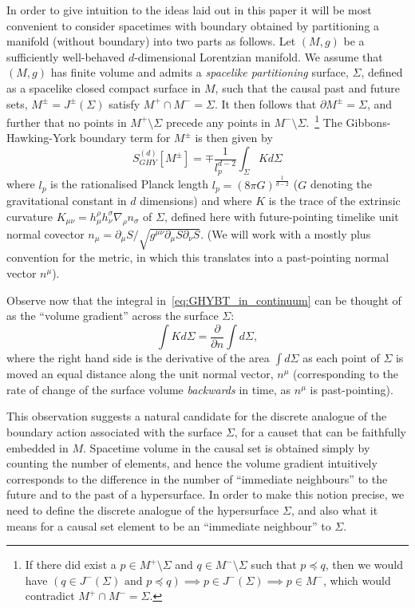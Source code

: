 \documentclass[12pt]{article}
\newcommand{\be}{\begin{equation}}
\newcommand{\ee}{\end{equation}}
\begin{document}
In order to give intuition to the ideas laid out in this paper it will be most convenient to consider spacetimes with boundary obtained by partitioning a manifold (without boundary) into two parts as follows. Let $(M,g)$ be a sufficiently well-behaved $d$-dimensional Lorentzian manifold. We assume that $(M,g)$ has finite volume and admits a \emph{spacelike partitioning} surface, $\Sigma$, defined as a spacelike closed compact surface in $M$, such that the causal past and future sets, $M^\pm=J^\pm (\Sigma)$ satisfy $M^+\cap M^-=\Sigma$. It then follows that $\partial M^\pm = \Sigma$, and further that no points in $M^+\setminus\Sigma$ precede any points in $M^-\setminus\Sigma$.~\!\footnote{If there did exist a $p\in M^+\setminus\Sigma$ and $q\in M^-\setminus\Sigma$ such that $p\preceq q$, then we would have $(q\in J^-(\Sigma) \text{ and } p\preceq q)\implies p\in J^-(\Sigma)\implies p\in M^-$, which would contradict $M^+\cap M^-=\Sigma$.} The Gibbons-Hawking-York boundary term for $M^\pm$ is then given by
\be\label{eq:GHYBT_in_continuum}
{S}^{(d)}_{GHY}\left[M^\pm\right]= \mp \frac{1}{l_p^{d-2}}\int_{\Sigma} K d\Sigma
\ee
where $l_p$ is the rationalised Planck length $l_p=(8\pi G)^{\frac{1}{d-2}}$ ($G$ denoting the gravitational constant in $d$ dimensions) and where $K$ is the trace of the extrinsic curvature $K_{\mu\nu}=h_{\mu}^\rho h_\nu^\sigma \nabla_\rho n_\sigma$ of $\Sigma$, defined here with future-pointing timelike unit normal covector $n_{\mu}=\partial_\mu S/\sqrt{g^{\mu\nu}\partial_\mu S\partial_\nu S}$. (We will work with a mostly plus convention for the metric, in which this translates into a past-pointing normal vector $n^{\mu}$). 

Observe now that the integral in~\eqref{eq:GHYBT_in_continuum} can be thought of as the ``volume gradient'' across the surface $\Sigma$:
\be\label{eq:normal_deriv_boundary}
\int K d\Sigma = \frac{\partial}{\partial n}\int d\Sigma,
\ee
where the right hand side is the derivative of the area $\int d\Sigma$ as each point of $\Sigma$ is moved an equal distance along the unit normal vector, $n^{\mu}$ (corresponding to the rate of change of the surface volume \emph{backwards} in time, as $n^{\mu}$ is past-pointing).

This observation suggests a natural candidate for the discrete analogue of the boundary action associated with the surface $\Sigma$, for a causet that can be faithfully embedded in $M$. Spacetime volume in the causal set is obtained simply by counting the number of elements, and hence the volume gradient intuitively corresponds to the difference in the number of ``immediate neighbours'' to the future and to the past of a hypersurface. In order to make this notion precise, we need to define the discrete analogue of the hypersurface $\Sigma$, and also what it means for a causal set element to be an ``immediate neighbour'' to $\Sigma$.
\end{document}

